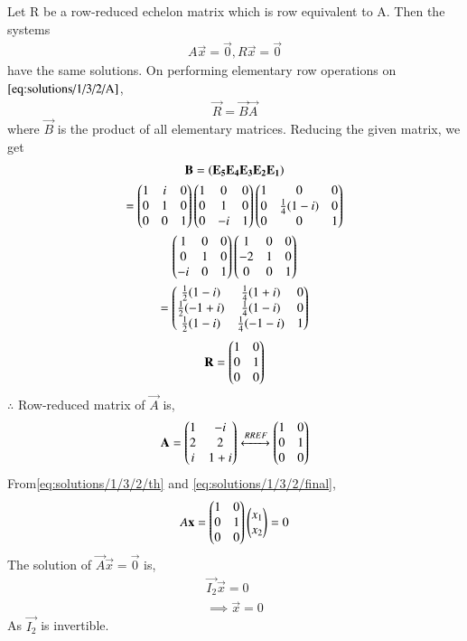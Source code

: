 Let R be a row-reduced echelon matrix which is row equivalent to A. Then the systems
%
\begin{align}
A \vec{x} = \vec{0}, R \vec{x} = \vec{0} \label{eq:solutions/1/3/2/th}
\end{align}
have the same solutions.
On performing elementary row operations on $\eqref{eq:solutions/1/3/2/A}$,
\begin{align}
\vec{R}=\vec{B}\vec{A}
\end{align}
where $\vec{B}$ is the product of all elementary matrices. Reducing the given matrix, we get
\begin{multline}
\mathbf{B} = \left(\mathbf{E_5}\mathbf{E_4}\mathbf{E_3}\mathbf{E_2}\mathbf{E_1}\right)\\
=\begin{pmatrix}1&i&0\\0&1&0\\0&0&1\end{pmatrix}\begin{pmatrix}1&0&0\\0&1&0\\0&-i&1\end{pmatrix}\begin{pmatrix}1&0&0\\0&\frac{1}{4}(1-i)&0\\0&0&1\end{pmatrix}\\
\begin{pmatrix}1&0&0\\0&1&0\\-i&0&1\end{pmatrix}\begin{pmatrix}1&0&0\\-2&1&0\\0&0&1\end{pmatrix} \\
=\begin{pmatrix}\frac{1}{2}(1-i)&\frac{1}{4}(1+i)&0\\
\frac{1}{2}(-1+i)&\frac{1}{4}(1-i)&0\\
\frac{1}{2}(1-i)&\frac{1}{4}(-1-i)&1\end{pmatrix}
\end{multline}
\begin{align}
\mathbf{R}=\begin{pmatrix}1&0\\0&1\\0&0\end{pmatrix} \label{eq:solutions/1/3/2/R}
\end{align}
$\therefore$ Row-reduced matrix of $\vec{A}$ is,
\begin{align}
\mathbf{A} =  \begin{pmatrix}1&-i\\2&2\\i&1+i\end{pmatrix}\xleftrightarrow[]{RREF}\begin{pmatrix}1&0\\0&1\\0&0\end{pmatrix}\label{eq:solutions/1/3/2/final}
\end{align}
From\eqref{eq:solutions/1/3/2/th} and \eqref{eq:solutions/1/3/2/final},
\begin{align}
A\mathbf{x} = \begin{pmatrix}1&0\\0&1\\0&0\end{pmatrix}\begin{pmatrix}x_1\\x_2\end{pmatrix} = 0
\end{align}
The solution of  $\vec{A}\vec{x}=\vec{0}$ is,
\begin{align}
\vec{I_2} \vec{x} = 0\\
\implies \vec{x} = 0
\end{align}
As $\vec{I_2}$ is invertible.
